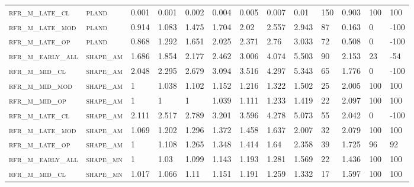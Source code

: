 \begin{landscape}
\begin{center}
\begin{footnotesize}
\begin{longtable}{lllllllllllll}
\textsc{rfr\_m\_late\_cl  } & \textsc{pland     }   & 0.001   & 0.001   & 0.002    & 0.004    & 0.005    & 0.007    & 0.01     & 150    & 0.903         & 100           & 100      \\
\textsc{rfr\_m\_late\_mod } & \textsc{pland     }   & 0.914   & 1.083   & 1.475    & 1.704    & 2.02     & 2.557    & 2.943    & 87     & 0.163         & 0             & -100     \\
\textsc{rfr\_m\_late\_op  } & \textsc{pland     }   & 0.868   & 1.292   & 1.651    & 2.025    & 2.371    & 2.76     & 3.033    & 72     & 0.508         & 0             & -100     \\
\textsc{rfr\_m\_early\_all} & \textsc{shape\_am }   & 1.686   & 1.854   & 2.177    & 2.462    & 3.006    & 4.074    & 5.503    & 90     & 2.153         & 23            & -54      \\
\textsc{rfr\_m\_mid\_cl   } & \textsc{shape\_am }   & 2.048   & 2.295   & 2.679    & 3.094    & 3.516    & 4.297    & 5.343    & 65     & 1.776         & 0             & -100     \\
\textsc{rfr\_m\_mid\_mod  } & \textsc{shape\_am }   & 1       & 1.038   & 1.102    & 1.152    & 1.216    & 1.322    & 1.502    & 25     & 2.005         & 100           & 100      \\
\textsc{rfr\_m\_mid\_op   } & \textsc{shape\_am }   & 1       & 1       & 1        & 1.039    & 1.111    & 1.233    & 1.419    & 22     & 2.097         & 100           & 100      \\
\textsc{rfr\_m\_late\_cl  } & \textsc{shape\_am }   & 2.111   & 2.517   & 2.789    & 3.201    & 3.596    & 4.278    & 5.073    & 55     & 2.042         & 0             & -100     \\
\textsc{rfr\_m\_late\_mod } & \textsc{shape\_am }   & 1.069   & 1.202   & 1.296    & 1.372    & 1.458    & 1.637    & 2.007    & 32     & 2.079         & 100           & 100      \\
\textsc{rfr\_m\_late\_op  } & \textsc{shape\_am }   & 1       & 1.108   & 1.265    & 1.348    & 1.414    & 1.64     & 2.358    & 39     & 1.725         & 96            & 92       \\
\textsc{rfr\_m\_early\_all} & \textsc{shape\_mn }   & 1       & 1.03    & 1.099    & 1.143    & 1.193    & 1.281    & 1.569    & 22     & 1.436         & 100           & 100      \\
\textsc{rfr\_m\_mid\_cl   } & \textsc{shape\_mn }   & 1.017   & 1.066   & 1.11     & 1.151    & 1.191    & 1.259    & 1.332    & 17     & 1.597         & 100           & 100      \\

\end{longtable}
\end{footnotesize}
\end{center}
\end{landscape}
